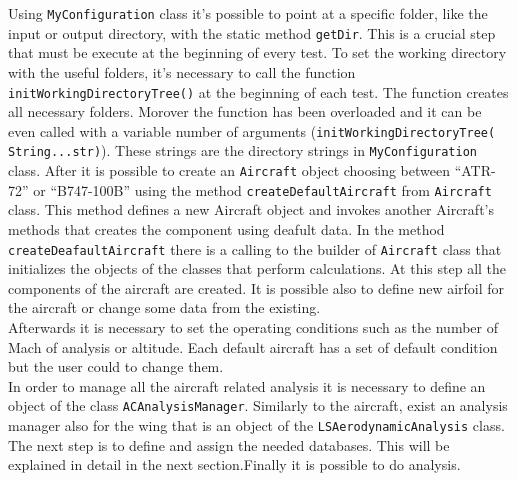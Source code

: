 Using  \texttt{MyConfiguration} class it's possible to point at a specific folder, like the input or output directory, with the static method  \texttt{getDir}. This is a crucial step that must be execute at the beginning of every test.
To set the working directory with the useful folders, it's necessary to call the function \texttt{initWorkingDirectoryTree()} at the beginning of each test. The function creates all necessary folders. Morover the function has been overloaded and it can be even called with a variable number of arguments (\texttt{initWorkingDirectoryTree( String...str)}). These strings are the directory strings in \texttt{MyConfiguration} class.
After it is possible to create an \texttt{Aircraft} object choosing between ``ATR-72'' or ``B747-100B'' using the method \texttt{createDefaultAircraft} from \texttt{Aircraft} class. This method defines a new Aircraft object and invokes another Aircraft's methods that creates the component using deafult data. In the method \texttt{createDeafaultAircraft} there is a calling to the builder of \texttt{Aircraft} class that initializes the objects of the classes that perform calculations. At this step all the components of the aircraft are created. It is possible also to define new airfoil for the aircraft or change some data from the existing. \\
Afterwards it is necessary to set the operating conditions such as the number of Mach of analysis or altitude. Each default aircraft has a set of default condition but the user could to change them.\\
In order to manage all the aircraft related analysis it is necessary to define an object of the class  \texttt{ACAnalysisManager}. Similarly to the aircraft,  exist an analysis manager also for the wing that is an object of the  \texttt{LSAerodynamicAnalysis} class. \\
The next step is to define and assign the needed databases. This will be explained in detail in the next section.Finally it is possible to do analysis.

